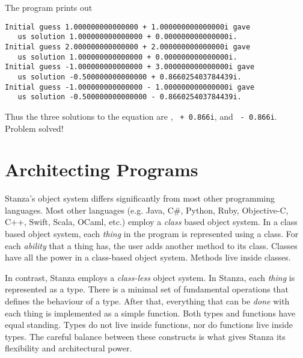 \documentclass[10pt,oneside]{book}
\begin{document}
The program prints out
\begin{lstlisting}
Initial guess 1.000000000000000 + 1.000000000000000i gave 
   us solution 1.000000000000000 + 0.000000000000000i.
Initial guess 2.000000000000000 + 2.000000000000000i gave 
   us solution 1.000000000000000 + 0.000000000000000i.
Initial guess -1.000000000000000 + 3.000000000000000i gave 
   us solution -0.500000000000000 + 0.866025403784439i.
Initial guess -1.000000000000000 - 1.000000000000000i gave 
   us solution -0.500000000000000 - 0.866025403784439i.
\end{lstlisting}

Thus the three solutions to the equation are \texttt{}, \texttt{ + 0.866i}, and \texttt{ - 0.866i}. Problem solved!

\chapter{Architecting Programs}

Stanza's object system differs significantly from most other programming languages. Most other languages (e.g. Java, C\#, Python, Ruby, Objective-C, C++, Swift, Scala, OCaml, etc.) employ a {\em class} based object system. In a class based object system, each {\em thing} in the program is represented using a class. For each {\em ability} that a thing has, the user adds another method to its class. Classes have all the power in a class-based object system. Methods live inside classes.

In contrast, Stanza employs a {\em class-less} object system. In Stanza, each {\em thing} is represented as a type. There is a minimal set of fundamental operations that defines the behaviour of a type. After that, everything that can be {\em done} with each thing is implemented as a simple function. Both types and functions have equal standing. Types do not live inside functions, nor do functions live inside types. The careful balance between these constructs is what gives Stanza its flexibility and architectural power.
\end{document}
